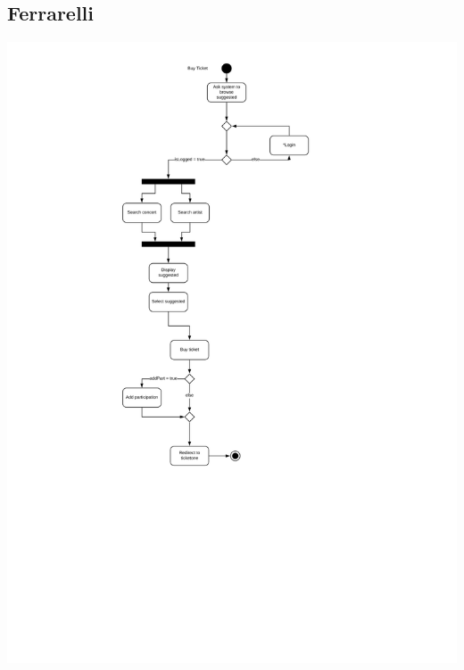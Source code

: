 \documentclass[11pt,a4paper]{article}
\begin{document}
\begin{itemize}
\subsection{Ferrarelli}
\includegraphics[scale=0.5]{hmwActivityDiagram.jpg}
\newpage

\end{itemize}
\end{document}
